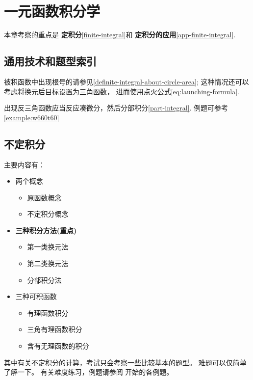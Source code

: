 \chapter{一元函数积分学}
\label{single-var-integral}

本章考察的重点是
\textbf{定积分}\ref{finite-integral}和
\textbf{定积分的应用}\ref{app-finite-integral}.

\section{通用技术和题型索引}

被积函数中出现根号的请参见\ref{definite-integral-about-circle-area};
这种情况还可以考虑将换元后目标设置为三角函数，
进而使用点火公式\ref{eq:launching-formula}.

出现反三角函数应当反应凑微分，然后分部积分\ref{part-integral}.
例题可参考\ref{example:w660t60}

\section{不定积分} \label{infinite-integral}

主要内容有：
\begin{itemize}
    \item 两个概念
        \begin{itemize}
            \item 原函数概念
            \item 不定积分概念
        \end{itemize}
    \item \textbf{三种积分方法(重点)}
        \begin{itemize}
            \item 第一类换元法
            \item 第二类换元法
            \item 分部积分法
        \end{itemize}
    \item 三种可积函数
        \begin{itemize}
            \item 有理函数积分
            \item 三角有理函数积分
            \item 含有无理函数的积分
        \end{itemize}
\end{itemize}
其中有关不定积分的计算，考试只会考察一些比较基本的题型。
难题可以仅简单了解一下。
有关难度练习，例题请参阅 \cite[page 96]{we} 开始的各例题。

